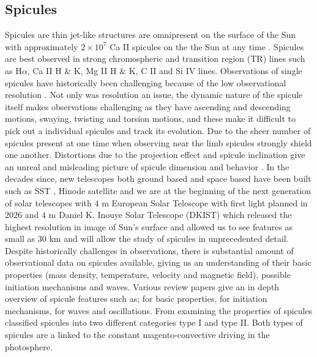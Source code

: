\documentclass[12pt]{ociamthesis}
\begin{document}
\subsection{Spicules}
\label{subsec:Spicules}
\par Spicules are thin jet-like structures are omnipresent on the surface of the Sun with approximately $2 \times 10^{7}$ Ca II spicules on the the Sun at any time \citep{Judge_2010ApJ}. Spicules are best observed in strong chromospheric and transition region (TR) lines such as H$\alpha$, Ca II H \& K, Mg II H \& K, C II and Si IV lines. Observations of single spicules have historically been challenging because of the low observational resolution \citep{Sterling_2000SoPh}. Not only was resolution an issue, the dynamic nature of the spicule itself makes observations challenging as they have ascending and descending motions, swaying, twisting and torsion motions, and these make it difficult to pick out a individual spicules and track its evolution. Due to the sheer number of spicules present at one time when observing near the limb spicules strongly shield one another. Distortions due to the projection effect and spicule inclination give an unreal and misleading picture of spicule dimension and behavior \citep{Porfir2016A}. In the decades since, new telescopes both ground based and space based have been built such as SST \citep{Scharmer2003SPIE}, Hinode satellite \citep{Tsuneta2008SoPh,Suematsu2008SoPh,Ichimoto2008SoPh} and we are at the beginning of the next generation of solar telescopes with $4$ m European Solar Telescope with first light planned in $2026$ \citep{Matthews2016SPIE} and $4$ m Daniel K. Inouye Solar Telescope (DKIST) which released the highest resolution in image of Sun's surface and allowed us to see features as small as $30$ km and will allow the study of spicules in unprecedented detail. Despite historically challenges in observations, there is substantial amount of observational data on spicules available, giving us an understanding of their basic properties (mass density, temperature, velocity and magnetic field), possible initiation mechanisms and waves. Various review papers give an in depth overview of spicule features such as; \cite{Beckers1968, Beckers1972ARA&A} for basic properties, \cite{Sterling_2000SoPh} for initiation mechanisms, \cite{Zaqarashvili_2009SSRv} for waves and oscillations. From examining the properties of spicules \cite{Pontieu2007PASJ} classified spicules into two different categories type I and type II. Both types of spicules are a linked to the constant magento-convective driving in the photosphere. \\ 
\end{document}
